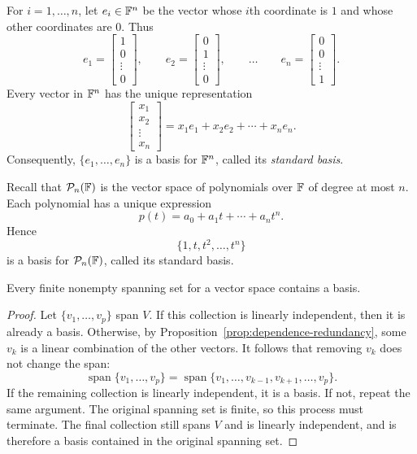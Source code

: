 \begin{example}
  For $i=1,\ldots,n$, let $e_i\in\mathbb{F}^n$ be the vector whose $i$th
  coordinate is $1$ and whose other coordinates are $0$. Thus
  \[
    e_1=\begin{bmatrix}1\\0\\\vdots\\0\end{bmatrix},
    \qquad
    e_2=\begin{bmatrix}0\\1\\\vdots\\0\end{bmatrix},
    \qquad\ldots\qquad
    e_n=\begin{bmatrix}0\\0\\\vdots\\1\end{bmatrix}.
  \]
  Every vector in $\mathbb{F}^n$ has the unique representation
  \[
    \begin{bmatrix}x_1\\x_2\\\vdots\\x_n\end{bmatrix}
    =x_1e_1+x_2e_2+\cdots+x_ne_n.
  \]
  Consequently, $\{e_1,\ldots,e_n\}$ is a basis for $\mathbb{F}^n$, called
  its \emph{standard basis}.
\end{example}

\begin{example}
  Recall that $\mathcal P_n(\mathbb{F})$ is the vector space of polynomials
  over $\mathbb{F}$ of degree at most $n$. Each polynomial has a unique
  expression
  \[
    p(t)=a_0+a_1t+\cdots+a_nt^n.
  \]
  Hence
  \[
    \{1,t,t^2,\ldots,t^n\}
  \]
  is a basis for $\mathcal P_n(\mathbb{F})$, called its standard basis.
\end{example}

\begin{proposition}
  Every finite nonempty spanning set for a vector space contains a basis.
\end{proposition}

\begin{proof}
  Let $\{v_1,\ldots,v_p\}$ span $V$. If this collection is linearly
  independent, then it is already a basis. Otherwise, by
  Proposition~\ref{prop:dependence-redundancy}, some $v_k$ is a linear
  combination of the other vectors. It follows that removing $v_k$ does
  not change the span:
  \[
    \operatorname{span}\{v_1,\ldots,v_p\}
    =\operatorname{span}\{v_1,\ldots,v_{k-1},v_{k+1},\ldots,v_p\}.
  \]
  If the remaining collection is linearly independent, it is a basis.
  If not, repeat the same argument. The original spanning set is finite,
  so this process must terminate. The final collection still spans $V$
  and is linearly independent, and is therefore a basis contained in the
  original spanning set.
\end{proof}


